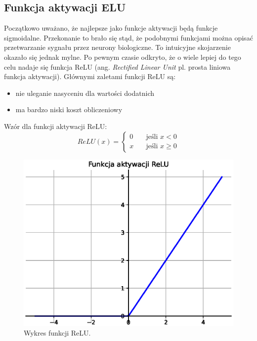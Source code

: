 \documentclass[a4paper,11pt]{article}
\begin{document}
    \subsection{Funkcja aktywacji ELU}

    Początkowo uważano, że najlepsze jako funkcje aktywacji będą funkcje sigmoidalne. Przekonanie to brało się stąd, że podobnymi funkcjami można opisać przetwarzanie sygnału przez neurony biologiczne. To intuicyjne skojarzenie okazało się jednak mylne. Po pewnym czasie odkryto, że o wiele lepiej do tego celu nadaje się funkcja ReLU (ang. \textit{Rectified Linear Unit} pl. prosta liniowa funkcja aktywacji)\cite{UczenieMaszynowe2018}. Głównymi zaletami funkcji ReLU są:
    \begin{itemize}
        \item nie uleganie nasyceniu dla wartości dodatnich
        \item ma bardzo niski koszt obliczeniowy
    \end{itemize}

    \bigskip

    \noindent
    \begin{minipage}[H]{\textwidth}
        \setlength\parindent{17pt} Wzór dla funkcji aktywacji ReLU: \\
        \begin{equation}
            \label{eq:relu}
            ReLU(x) =
            \begin{cases}
                0 & \quad \text{jeśli } x < 0 \\
                x & \quad \text{jeśli } x \geq 0
            \end{cases}
        \end{equation}
    \end{minipage}

    \bigskip

    \begin{figure}[H]
        \label{fig:relu}
        \centering
        \includegraphics[width=\textwidth]{relu}
        \caption{Wykres funkcji ReLU.}
    \end{figure}
\end{document}
